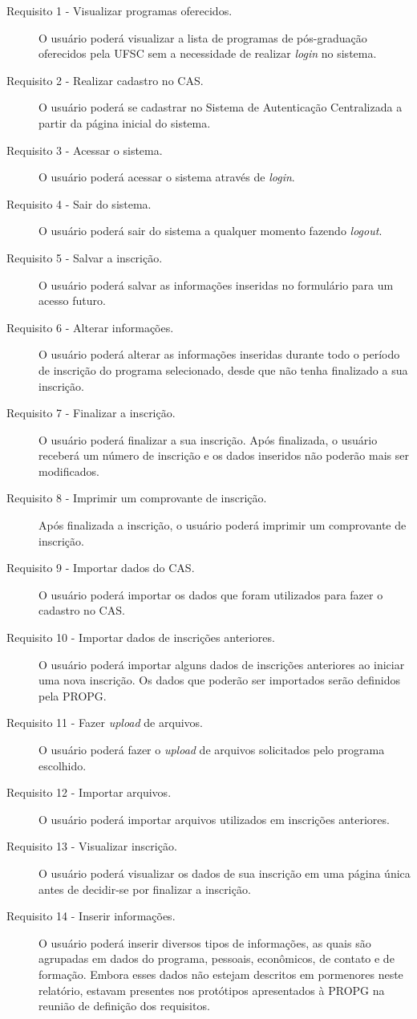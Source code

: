 \documentclass[
  10.5pt,				  %
	openright,			%
	twoside,			  %
  a5paper,
  chapter=TITLE,	%
	section=TITLE,	%
  hyphens,        %
	english,        %
	brazil          %
]{abntex2}
\begin{document}
\begin{description}
\item[Requisito 1 - Visualizar programas oferecidos.] O usuário poderá visualizar a lista de programas de pós-graduação oferecidos pela UFSC sem a necessidade de realizar \emph{login} no sistema.
\item[Requisito 2 - Realizar cadastro no CAS.] O usuário poderá se cadastrar no Sistema de Autenticação Centralizada a partir da página inicial do sistema.
\item[Requisito 3 - Acessar o sistema.] O usuário poderá acessar o sistema através de \emph{login}.
\item[Requisito 4 - Sair do sistema.] O usuário poderá sair do sistema a qualquer momento fazendo \emph{logout}.
\item[Requisito 5 - Salvar a inscrição.] O usuário poderá salvar as informações inseridas no formulário para um acesso futuro.
\item[Requisito 6 - Alterar informações.] O usuário poderá alterar as informações inseridas durante todo o período de inscrição do programa selecionado, desde que não tenha finalizado a sua inscrição.
\item[Requisito 7 - Finalizar a inscrição.] O usuário poderá finalizar a sua inscrição. Após finalizada, o usuário receberá um número de inscrição e os dados inseridos não poderão mais ser modificados.
\item[Requisito 8 - Imprimir um comprovante de inscrição.] Após finalizada a inscrição, o usuário poderá imprimir um comprovante de inscrição.
\item[Requisito 9 - Importar dados do CAS.] O usuário poderá importar os dados que foram utilizados para fazer o cadastro no CAS.
\item[Requisito 10 - Importar dados de inscrições anteriores.] O usuário poderá importar alguns dados de inscrições anteriores ao iniciar uma nova inscrição. Os dados que poderão ser importados serão definidos pela PROPG.
\item[Requisito 11 - Fazer \emph{upload} de arquivos.] O usuário poderá fazer o \emph{upload} de arquivos solicitados pelo programa escolhido.
\item[Requisito 12 - Importar arquivos.] O usuário poderá importar arquivos utilizados em inscrições anteriores.
\item[Requisito 13 - Visualizar inscrição.] O usuário poderá visualizar os dados de sua inscrição em uma página única antes de decidir-se por finalizar a inscrição.
\item[Requisito 14 - Inserir informações.] O usuário poderá inserir diversos tipos de informações, as quais são agrupadas em dados do programa, pessoais, econômicos, de contato e de formação. Embora esses dados não estejam descritos em pormenores neste relatório, estavam presentes nos protótipos apresentados à PROPG na reunião de definição dos requisitos.
\end{description}
\end{document}
